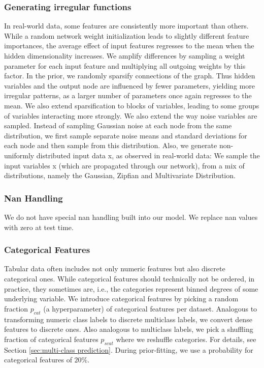 \documentclass{article}
\begin{document}
\subsubsection{Generating irregular functions} \label{app:irregular_funcs}

In real-world data, some features are consistently more important than others. While a random network weight initialization leads to slightly different feature importances, the average effect of input features regresses to the mean when the hidden dimensionality increases. We amplify differences by sampling a weight parameter for each input feature and multiplying all outgoing weights by this factor.
In the prior, we randomly sparsify connections of the graph. Thus hidden variables and the output node are influenced by fewer parameters, yielding more irregular patterns, as a larger number of parameters once again regresses to the mean. We also extend sparsification to blocks of variables, leading to some groups of variables interacting more strongly.
We also extend the way noise variables are sampled. Instead of sampling Gaussian noise at each node from the same distribution, we first sample separate noise means and standard deviations for each node and then sample from this distribution.
Also, we generate non-uniformly distributed input data x, as observed in real-world data: We sample the input variables x (which are propagated through our network), from a mix of distributions, namely the Gaussian, Zipfian and Multivariate Distribution.

\subsubsection{Nan Handling}
We do not have special nan handling built into our model.
We replace nan values with zero at test time.

\subsubsection{Categorical Features}
Tabular data often includes not only numeric features but also discrete categorical ones. While categorical features should technically not be ordered, in practice, they sometimes are, i.e., the categories represent binned degrees of some underlying variable. We introduce categorical features by picking a random fraction $p_{cat}$ (a hyperparameter) of categorical features per dataset. Analogous to transforming numeric class labels to discrete multiclass labels, we convert dense features to discrete ones. Also analogous to multiclass labels, we pick a shuffling fraction of categorical features $p_{scat}$ where we reshuffle categories. For details, see Section \ref{sec:multi-class prediction}.
During prior-fitting, we use a probability for categorical features of $20\%$.
\end{document}
